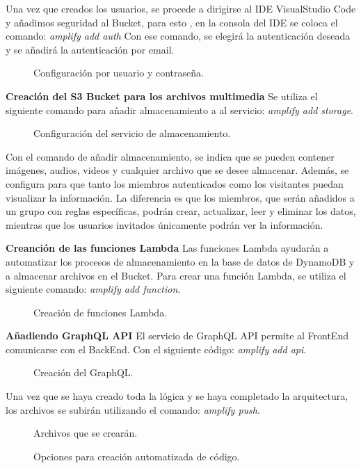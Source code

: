 \noindent Una vez que creados los usuarios, se procede a dirigirse al IDE VisualStudio Code y añadimos seguridad al Bucket, para esto , en la consola del IDE  se coloca el comando: \textit{amplify add auth}
\newline
Con ese comando, se elegirá la autenticación deseada y se añadirá la autenticación por email.
\begin{figure}[H]
    \centering
    \caption{Configuración por usuario y contraseña.}
\end{figure}

 \noindent \textbf{\large Creación del S3 Bucket para los archivos multimedia} \newline
Se utiliza el siguiente comando para añadir almacenamiento a al servicio: \textit{amplify add storage}.
\begin{figure}[H]
    \centering
    \caption{Configuración del servicio de almacenamiento.}
\end{figure}
\noindent Con el comando de añadir almacenamiento, se indica que se pueden contener imágenes, audios, videos y cualquier archivo que se desee almacenar. Además, se configura para que tanto los miembros autenticados como los visitantes puedan visualizar la información. La diferencia es que los miembros, que serán añadidos a un grupo con reglas específicas, podrán crear, actualizar, leer y eliminar los datos, mientras que los usuarios invitados únicamente podrán ver la información.

\noindent \textbf{\large Creanción de las funciones Lambda 
} \newline
Las funciones Lambda ayudarán a automatizar los procesos de almacenamiento en la base de datos de DynamoDB y a almacenar archivos en el Bucket. Para crear una función Lambda, se utiliza el siguiente comando: \textit{amplify add function}.
\begin{figure}[H]
    \centering
    \caption{Creación de funciones Lambda.}
\end{figure}

 \noindent \textbf{\large Añadiendo GraphQL API} \newline
El servicio de GraphQL API permite al FrontEnd comunicarse con el BackEnd. Con el siguiente código: \textit{amplify add api}.
\begin{figure}[H]
    \centering
    \caption{Creación del GraphQL.}
\end{figure}
Una vez que se haya creado toda la lógica y se haya completado la arquitectura, los archivos se subirán utilizando el comando: \textit{amplify push}.
\begin{figure}[H]
    \centering
    \caption{Archivos que se crearán.}
\end{figure}
\begin{figure}[H]
    \centering
    \caption{Opciones para creación automatizada de código.}
\end{figure}

